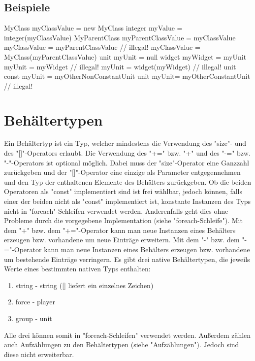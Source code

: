 \subsection{Beispiele}
MyClass myClassValue = new MyClass
integer myValue = integer(myClassValue)
MyParentClass myParentClassValue = myClassValue
myClassValue = myParentClassValue // illegal!
myClassValue = MyClass(myParentClassValue)
unit myUnit = null
widget myWidget = myUnit
myUnit = myWidget // illegal!
myUnit = widget(myWidget) // illegal!
unit const myUnit = myOtherNonConstantUnit
unit myUnit= myOtherConstantUnit // illegal!

\section{Behältertypen}
Ein Behältertyp ist ein Typ, welcher mindestens die Verwendung des "size"- und des "[]"-Operators erlaubt.
Die Verwendung des "+=" bzw. "+" und des "-=" bzw. "-"-Operators ist optional möglich.
Dabei muss der "size"-Operator eine Ganzzahl zurückgeben und der "[]"-Operator eine einzige als
Parameter entgegennehmen und den Typ der enthaltenen Elemente des Behälters zurückgeben.
Ob die beiden Operatoren als "const" implementiert sind ist frei wählbar, jedoch können, falls
einer der beiden nicht als "const" implementiert ist, konstante Instanzen des Typs nicht in
"foreach"-Schleifen verwendet werden.
Anderenfalls geht dies ohne Probleme durch die vorgegebene Implementation (siehe "foreach-Schleife").
Mit dem "+" bzw. dem "+="-Operator kann man neue Instanzen eines Behälters erzeugen bzw. vorhandene um neue Einträge erweitern.
Mit dem "-" bzw. dem "-="-Operator kann man neue Instanzen eines Behälters erzeugen bzw. vorhandene um bestehende Einträge verringern.
Es gibt drei native Behältertypen, die jeweils Werte eines bestimmten nativen Typs enthalten:
\begin{enumerate}
\item string - string ([] liefert ein einzelnes Zeichen)
\item force - player
\item group - unit
\end{enumerate}

Alle drei können somit in "foreach-Schleifen" verwendet werden.
Außerdem zählen auch Aufzählungen zu den Behältertypen (siehe "Aufzählungen"). Jedoch sind diese nicht erweiterbar.

